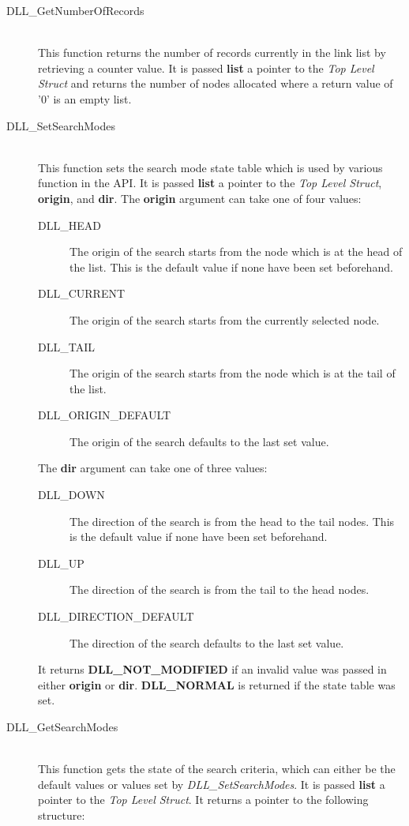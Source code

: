 \documentclass[10pt,letterpaper]{report}
\begin{document}
\begin{description}
\begin{description}
 \item[DLL\_GetNumberOfRecords]\quad\\
 This function returns the number of records currently in the link list by retrieving a counter value.  It is passed \textbf{list} a pointer to the \emph{Top Level Struct} and returns the number of nodes allocated where a return value of '0' is an empty list.

 \item[DLL\_SetSearchModes]\quad\\
 This function sets the search mode state table which is used by various function in the API.  It is passed \textbf{list} a pointer to the \emph{Top Level Struct}, \textbf{origin}, and \textbf{dir}.  The \textbf{origin} argument can take one of four values:

  \begin{description}
  \item[DLL\_HEAD] The origin of the search starts from the node which is at the head of the list.  This is the default value if none have been set beforehand.
  \item[DLL\_CURRENT] The origin of the search starts from the currently selected node.
  \item[DLL\_TAIL] The origin of the search starts from the node which is at the tail of the list.
  \item[DLL\_ORIGIN\_DEFAULT] The origin of the search defaults to the last set value.
  \end{description}

 The \textbf{dir} argument can take one of three values:

  \begin{description}
  \item[DLL\_DOWN] The direction of the search is from the head to the tail nodes.  This is the default value if none have been set beforehand.
  \item[DLL\_UP] The direction of the search is from the tail to the head nodes.
  \item[DLL\_DIRECTION\_DEFAULT] The direction of the search defaults to the last set value.
  \end{description}

 It returns \textbf{DLL\_NOT\_MODIFIED} if an invalid value was passed in either \textbf{origin} or \textbf{dir}.  \textbf{DLL\_NORMAL} is returned if the state table was set.

 \item[DLL\_GetSearchModes]\quad\\
 This function gets the state of the search criteria, which can either be the default values or values set by \emph{DLL\_SetSearchModes}.  It is passed \textbf{list} a pointer to the \emph{Top Level Struct}.  It returns a pointer to the following structure:


\end{description}
\end{description}
\end{document}
